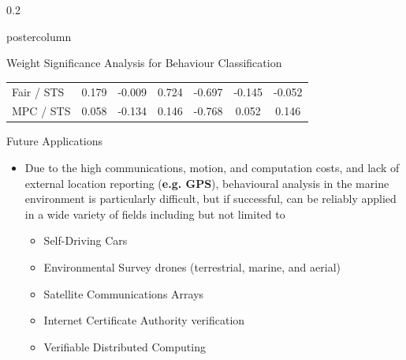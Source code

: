 \documentclass[final,hyperref={pdfpagelabels=false}]{beamer}
\def\colwidth{0.2\linewidth}
\begin{document}
\begin{frame}[fragile]
\begin{columns}[T]
\begin{column}{\colwidth}
\begin{beamercolorbox}[center,wd=\textwidth]{postercolumn}
\begin{minipage}[T]{.98\textwidth}
{\begin{block}{Weight Significance Analysis for Behaviour Classification}
\begin{table}[h]
\begin{center}
\begin{tabular}{lcccccc}
										Fair / STS       & 0.179 &  -0.009  &  0.724  & -0.697   & -0.145   & -0.052\\
										MPC / STS        & 0.058 &  -0.134  &  0.146  & -0.768   &  0.052   &  0.146\\
										\bottomrule
									\end{tabular}
								\end{center}
							\end{table}
						\end{block}
						
						\begin{block}{Future Applications}
							\begin{itemize}
								\item Due to the high communications, motion, and computation costs, and lack of external location reporting (\textbf{e.g. GPS}), 
								behavioural analysis in the marine environment is particularly difficult, but if successful, can be reliably applied in a wide 
								variety of fields including but not limited to
								\begin{itemize}
									\item Self-Driving Cars
									\item Environmental Survey drones (terrestrial, marine, and aerial)
									\item Satellite Communications Arrays
									\item Internet Certificate Authority verification
									\item Verifiable Distributed Computing
								\end{itemize}
							\end{itemize}              
						\end{block}
												
}
\end{minipage}
\end{beamercolorbox}
\end{column}
\end{columns}
\end{frame}
\end{document}

